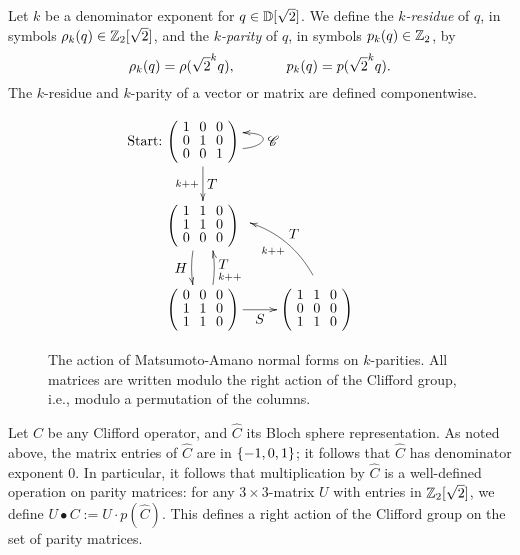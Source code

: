 \begin{definition}[$k$-parity]
  Let $k$ be a denominator exponent for $q\in\mathbb{D}[\sqrt{2}]$. We define the {\em $k$-residue} of $q$, in
  symbols $\rho_k(q)\in \mathbb{Z}_2[\sqrt{2}]$, and the {\em $k$-parity} of $q$, in symbols $p_k(q)\in\mathbb{Z}_2$, by
  \[
    \rho_k(q) = \rho(\sqrt{2}^k q),
    \hspace{0.5in}
    p_k(q) = p(\sqrt{2}^k q).
  \]
  The $k$-residue and $k$-parity of a vector or matrix are defined componentwise.
\end{definition}

\begin{figure}
  \[
  \xymatrix{
    *+{\makebox[0in][r]{Start:~}\zmatrix{ccc}{1&0&0 \\ 0&1&0 \\ 0&0&1}}
    \ar[d]^<>(.5){\displaystyle T}_<>(.5){k\pp}
    \ar@<1.5ex>@(dr,r)[]+R_<>(.53){\displaystyle \sC}
    \\
    *+{\zmatrix{ccc}{1&1&0 \\ 1&1&0 \\ 0&0&0}}
    \ar@<-0.5ex>@/_/[d]_<>(.5){\displaystyle H}
    \\
    *+{\zmatrix{ccc}{0&0&0 \\ 1&1&0 \\ 1&1&0}}
    \ar[r]_<>(.5){\displaystyle S}
    \ar@<-0.5ex>@/_/[u]_<>(.6){\displaystyle T}_<>(.25){k\pp}
    &
    *+{\zmatrix{ccc}{1&1&0 \\ 0&0&0 \\ 1&1&0}}
    \ar@<-2ex>@/_4ex/[ul]_<>(.5){\displaystyle T}^<>(.5){k\pp}
  }
  \]
  \caption{The action of Matsumoto-Amano normal forms on
    $k$-parities. All matrices are written modulo the right action
    of the Clifford group, i.e., modulo a permutation of the
    columns.}\label{fig-so3-action}
\end{figure}

\begin{remark}
  Let $C$ be any Clifford operator, and $\hat C$ its Bloch sphere representation. As noted above,
  the matrix entries of $\hat C$ are in $\{-1,0,1\}$; it follows that $\hat C$ has denominator
  exponent 0. In particular, it follows that multiplication by $\hat C$ is a well-defined operation
  on parity matrices: for any $3\times 3$-matrix $U$ with entries in $\mathbb{Z}_2[\sqrt{2}]$, we define $U\bullet C
  := U\cdot p(\hat C)$. This defines a right action of the Clifford group on the set of parity
  matrices.
\end{remark}

